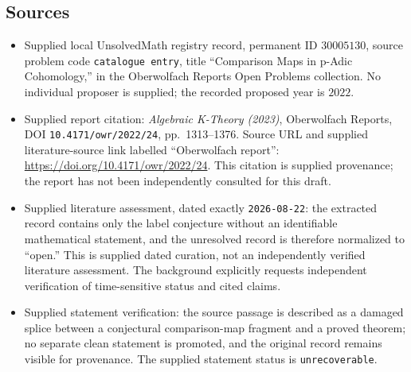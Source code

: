 \documentclass[11pt]{article}
\begin{document}
\subsection{Sources}
\begin{itemize}
\item Supplied local UnsolvedMath registry record, permanent ID \(30005130\), source problem code \texttt{catalogue entry}, title ``Comparison Maps in p-Adic Cohomology,'' in the Oberwolfach Reports Open Problems collection. No individual proposer is supplied; the recorded proposed year is \(2022\).
\item Supplied report citation: \emph{Algebraic K-Theory (2023)}, Oberwolfach Reports, DOI \texttt{10.4171/owr/2022/24}, pp.\ 1313--1376. Source URL and supplied literature-source link labelled ``Oberwolfach report'': \url{https://doi.org/10.4171/owr/2022/24}. This citation is supplied provenance; the report has not been independently consulted for this draft.
\item Supplied literature assessment, dated exactly \texttt{2026-08-22}: the extracted record contains only the label conjecture without an identifiable mathematical statement, and the unresolved record is therefore normalized to ``open.'' This is supplied dated curation, not an independently verified literature assessment. The background explicitly requests independent verification of time-sensitive status and cited claims.
\item Supplied statement verification: the source passage is described as a damaged splice between a conjectural comparison-map fragment and a proved theorem; no separate clean statement is promoted, and the original record remains visible for provenance. The supplied statement status is \texttt{unrecoverable}.
\end{itemize}
\end{document}

